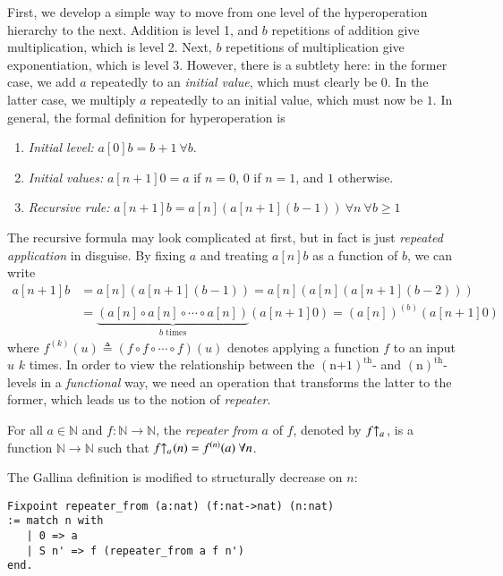 First, we develop a simple way to move 
from one level of the hyperoperation hierarchy to the
next. Addition is level 1, and $b$ repetitions of addition
give multiplication, which is level 2. Next, $b$ repetitions of 
multiplication give exponentiation, which is level 3. However, 
there is a subtlety here: in the former case, we add $a$ 
repeatedly to an \textit{initial value}, which must clearly be $0$. 
In the latter case, we multiply $a$ repeatedly to an initial value, 
which must now be $1$. In general, the formal definition for hyperoperation is
\begin{enumerate}
	\item \textit{Initial level:} $a[0]b = b + 1 \ \forall b$.
	\item \textit{Initial values:} $a[n+1]0 = a$ if $n = 0$, $0$ if $n = 1$, and $1$ otherwise.
	\item \textit{Recursive rule:} $ a[n+1]b = a[n]\left(a[n+1](b - 1)\right) \ \forall n \ \forall b \ge 1$
\end{enumerate}
The recursive formula may look complicated at first, but in fact is just \emph{repeated application} in disguise. By fixing $a$ and treating $a[n]b$ as a function of $b$, we can write
$$ \begin{aligned}
a[n+1]b & = a[n]\left(a[n+1](b-1)\right) = a[n]\left(a[n](a[n+1](b-2))\right) \\
 & =  \underbrace{\left( a[n]\circ a[n]\circ \cdots \circ a[n] \right)}_{b \text{ times}} \left(a[n+1]0\right) = \left(a[n]\right)^{(b)}\left(a[n+1]0\right)
\end{aligned} $$
where $f^{(k)}(u) \triangleq (f\circ f\circ \cdots \circ f)(u)$ denotes applying a function $f$ to an input $u$ $k$ times. In order to view the relationship between the $(\text{n+1})^{\text{th}}$- and $(\text{n})^{\text{th}}$-levels in a \emph{functional} way, we need an operation that transforms the latter to the former, which leads us to the notion of \emph{repeater}.
\begin{defn}
For all $a\in \mathbb{N}$ and $f: \mathbb{N}\to \mathbb{N}$, the \emph{repeater from} $a$ of $f$, denoted by $\rf{f}{a}$ , is a function $\mathbb{N}\to \mathbb{N}$ such that $\rf{f}{a}(n) = f^{(n)}(a) \ \forall n$.
\end{defn}
The Gallina definition is modified to structurally decrease on $n$:
\begin{lstlisting}
Fixpoint repeater_from (a:nat) (f:nat->nat) (n:nat)
:= match n with
   | 0 => a
   | S n' => f (repeater_from a f n')
end. 
\end{lstlisting}
